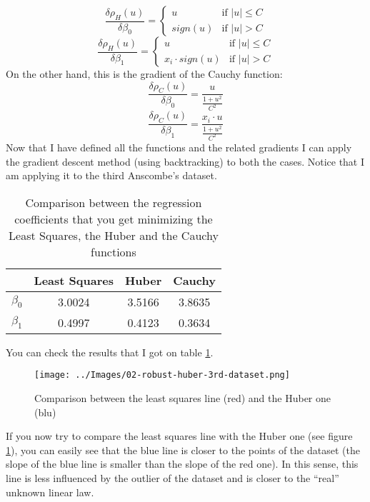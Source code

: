     \[
        \frac{\delta\rho_H(u)}{\delta\beta_0} =
        \begin{cases}
            u &         \text{if } |u| \leq C \\
            sign(u) &   \text{if } |u| > C
        \end{cases}    
    \]
    \[
        \frac{\delta\rho_H(u)}{\delta\beta_1} =
        \begin{cases}
            u &                     \text{if } |u| \leq C \\
            x_i \cdot sign(u) &     \text{if } |u| > C
        \end{cases}
    \]
    On the other hand, this is the gradient of the Cauchy function:
    \[
        \frac{\delta\rho_C(u)}{\delta\beta_0} = \frac{u}{\frac{1 + u^2}{C^2}}
    \]
    \[
        \frac{\delta\rho_C(u)}{\delta\beta_1} = \frac{x_i \cdot u}{\frac{1 + u^2}{C^2}}
    \]
    Now that I have defined all the functions and the related gradients I can apply the gradient descent method (using backtracking) to both the cases. Notice that I am applying it to the third Anscombe's dataset.
    \begin{table}
        \centering
        \begin{tabu}{| c | c | c | c |}
            \hline
            &               Least Squares &     Huber &     Cauchy \\ \hline
            \(\beta_0\) &   3.0024 &            3.5166 &    3.8635 \\ \hline
            \(\beta_1\) &   0.4997 &            0.4123 &    0.3634 \\ \hline
        \end{tabu}
        \caption{Comparison between the regression coefficients that you get minimizing the Least Squares, the Huber and the Cauchy functions}
        \label{comparison-coefficients}
    \end{table}
    You can check the results that I got on table \ref{comparison-coefficients}.\par
    \begin{figure}
        \centering
        \texttt{[image: ../Images/02-robust-huber-3rd-dataset.png]}
        \caption{Comparison between the least squares line (red) and the Huber one (blu)}
        \label{least-square-huber-lines-comparison}
    \end{figure}
    If you now try to compare the least squares line with the Huber one (see figure \ref{least-square-huber-lines-comparison}), you can easily see that the blue line is closer to the points of the dataset (the slope of the blue line is smaller than the slope of the red one). In this sense, this line is less influenced by the outlier of the dataset and is closer to the ``real'' unknown linear law.\par
